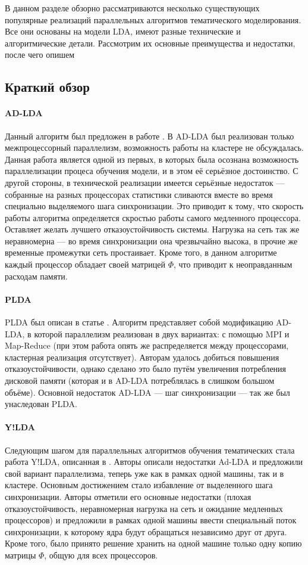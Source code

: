 
В данном разделе обзорно рассматриваются несколько существующих популярные реализаций параллельных алгоритмов тематического моделирования. Все они основаны на модели LDA, имеют разные технические и алгоритмические детали. Рассмотрим их основные преимущества и недостатки, после чего опишем 

\subsection{Краткий обзор}

\paragraph{AD-LDA}
Данный алгоритм был предложен в работе \cite{ad_lda}. В AD-LDA был реализован только межпроцессорный параллелизм, возможность работы на кластере не обсуждалась. Данная работа является одной из первых, в которых была осознана возможность параллелизации процеса обучения модели, и в этом её серьёзное достоинство. С другой стороны, в технической реализации имеется серьёзные недостаток --- собранные на разных процессорах статистики сливаются вместе во время специально выделяемого шага синхронизации. Это приводит к тому, что скорость работы алгоритма определяется скростью работы самого медленного процессора. Оставляет желать лучшего отказоустойчивость системы. Нагрузка на сеть так же неравномерна --- во время синхронизации она чрезвычайно высока, в прочие же временные промежутки сеть простаивает. Кроме того, в данном алгоритме каждый процессор обладает своей матрицей $\Phi$, что приводит к неоправданным расходам памяти.

\paragraph{PLDA}
PLDA был описан в статье \cite{plda}. Алгоритм представляет собой модификацию AD-LDA, в которой параллелизм реализован в двух вариантах: с помощью MPI и Map-Reduce (при этом работа опять же распределяется между процессорами, кластерная реализация отсутствует). Авторам удалось добиться повышения отказоустойчивости, однако сделано это было путём увеличения потребления дисковой памяти (которая и в AD-LDA потреблялась в слишком большом объёме). Основной недостаток AD-LDA --- шаг синхронизации --- так же был унаследован PLDA.

\paragraph{Y!LDA}
Следующим шагом для параллельных алгоритмов обучения тематических стала работа Y!LDA, описанная в \cite{y_lda}. Авторы описали недостатки Ad-LDA и предложили свой вариант параллелизма, теперь уже как в рамках одной машины, так и в кластере. Основным достижением стало избавление от выделенного шага синхронизации. Авторы отметили его основные недостатки (плохая отказоустойчивость, неравномерная нагрузка на сеть и ожидание медленных процессоров) и предложили в рамках одной машины ввести специальный поток синхронизации, к которому ядра будут обращаться независимо друг от друга. Кроме того, было принято решение хранить на одной машине только одну копию матрицы $\Phi$, общую для всех процессоров.

